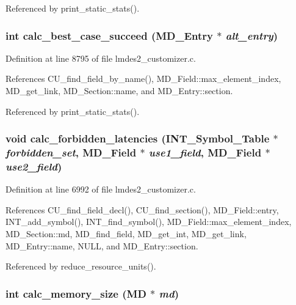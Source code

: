 Referenced by print\_\-static\_\-stats().
\subsubsection{\setlength{\rightskip}{0pt plus 5cm}int calc\_\-best\_\-case\_\-succeed (\bf{MD\_\-Entry} $\ast$ {\em alt\_\-entry})}\label{lmdes2__customizer_8c_6953d208b5ecd712ff502c07d454e67b}




Definition at line 8795 of file lmdes2\_\-customizer.c.

References CU\_\-find\_\-field\_\-by\_\-name(), MD\_\-Field::max\_\-element\_\-index, MD\_\-get\_\-link, MD\_\-Section::name, and MD\_\-Entry::section.

Referenced by print\_\-static\_\-stats().
\subsubsection{\setlength{\rightskip}{0pt plus 5cm}void calc\_\-forbidden\_\-latencies (\bf{INT\_\-Symbol\_\-Table} $\ast$ {\em forbidden\_\-set}, \bf{MD\_\-Field} $\ast$ {\em use1\_\-field}, \bf{MD\_\-Field} $\ast$ {\em use2\_\-field})}\label{lmdes2__customizer_8c_4b2133824eaddc147250f9325ba07988}




Definition at line 6992 of file lmdes2\_\-customizer.c.

References CU\_\-find\_\-field\_\-decl(), CU\_\-find\_\-section(), MD\_\-Field::entry, INT\_\-add\_\-symbol(), INT\_\-find\_\-symbol(), MD\_\-Field::max\_\-element\_\-index, MD\_\-Section::md, MD\_\-find\_\-field, MD\_\-get\_\-int, MD\_\-get\_\-link, MD\_\-Entry::name, NULL, and MD\_\-Entry::section.

Referenced by reduce\_\-resource\_\-units().
\subsubsection{\setlength{\rightskip}{0pt plus 5cm}int calc\_\-memory\_\-size (\bf{MD} $\ast$ {\em md})}\label{lmdes2__customizer_8c_d54eaab305504150964b0f25c12b30d2}




